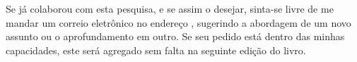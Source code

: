 \begin{patrocinio}
\begin{center}
{\begin{minipage}[c][]{13.5cm}
    \hspace{0.5cm}
    Se já colaborou com esta pesquisa, e se assim o desejar, 
    sinta-se livre de me mandar um correio eletrônico no endereço
    \ImprimirEmail, 
    sugerindo a abordagem de um novo assunto ou o aprofundamento em outro.
    Se seu pedido está dentro das minhas capacidades, 
    este será agregado sem falta na seguinte edição do livro.\\

    \begin{flushright}
    \myauthor ~\\ 
    \end{flushright}

	\end{minipage}}
	\end{center}
\end{patrocinio}%

